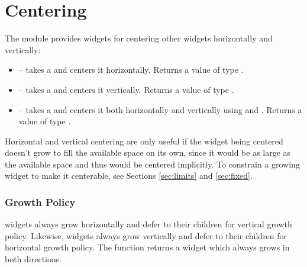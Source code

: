 \section{Centering}
\label{sec:centering}

The  module provides widgets for centering other widgets
horizontally and vertically:

\begin{itemize}
\item {} -- takes a  and centers it
  horizontally.  Returns a value of type .
\item {} -- takes a  and centers it
  vertically.  Returns a value of type .
\item {} -- takes a  and centers it both
  horizontally and vertically using  and .
  Returns a value of type .
\end{itemize}

Horizontal and vertical centering are only useful if the widget being
centered doesn't grow to fill the available space on its own, since it
would be as large as the available space and thus would be centered
implicitly.  To constrain a growing widget to make it centerable, see
Sections \ref{sec:limits} and \ref{sec:fixed}.

\subsubsection{Growth Policy}

 widgets always grow horizontally and defer to their
children for vertical growth policy.  Likewise,  widgets
always grow vertically and defer to their children for horizontal
growth policy.  The  function returns a widget which
always grows in both directions.
